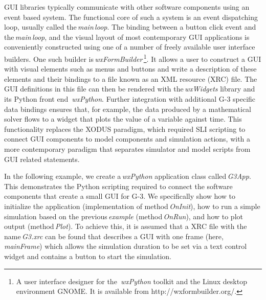 \documentclass[10pt]{article}
\begin{document}
GUI libraries typically communicate with other software components
using an event based system.  The functional core of such a system is an
event dispatching loop, usually called the\,{\it main\,loop}.
The binding between a button click event and the\,{\it main\,loop}, and
the visual layout of most contemporary GUI applications is
conveniently constructed using one of a number of freely available user
interface builders.
%
%
One such builder is\,{\it wxFormBuilder}\,\footnote{A user interface designer for the\,{\it
    wxPython} toolkit and the Linux desktop environment GNOME. It is
  available from http://wxformbuilder.org/.}. It allows a user to construct a GUI with visual elements
such as menus and buttons and write a description of these elements and
their bindings to a file known as an XML resource (XRC) file.  The GUI
definitions in this file can then be rendered with the\,{\it wxWidgets} library and its Python front end\,{\it
  wxPython}.  Further integration with additional G-3 specific data
bindings ensures that, for example, the data produced by a
mathematical solver flows to a widget that plots the value of a
variable against time.  This functionality replaces the
XODUS paradigm, which required SLI scripting to connect GUI components
to model components and simulation actions, with a more contemporary
paradigm that separates simulator and model scripts from GUI related
statements.

In the following example, we create a\,{\it wxPython} application class
called\,{\it G3App}. This demonstrates the Python scripting required to
connect the software components that create a small GUI for G-3.  We
specifically show how to initialize the application (implementation of
method\,{\it OnInit}), how to run a simple simulation based on the
previous\,{\it example} (method\,{\it OnRun}), and how to plot output
(method\,{\it Plot}).  To achieve this, it is assumed that a XRC file with the
name\,{\it G3.xrc} can be found that describes a GUI with one frame
(here,\,{\it mainFrame}) which allows the simulation duration to be set
via a text control widget and contains a button to start the simulation.
\end{document}
